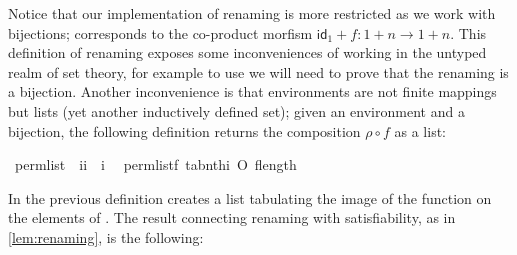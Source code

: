 Notice that our implementation of renaming is more restricted as we
work with bijections;  corresponds to
the co-product morfism $\mathsf{id}_{1}+f \colon 1 + n \to 1 +
n$. This definition of renaming exposes some inconveniences of working
in the untyped realm of set theory, for example to use  we
will need to prove that the renaming is a bijection. Another
inconvenience is that environments are not finite mappings but lists
(yet another inductively defined set); given an environment and a
bijection, the following definition returns the composition
$\rho \circ f$ as a list:
\begin{isabelle}
  \isamarkupfalse%
\ perm{\isacharunderscore}list\ {\isacharcolon}{\isacharcolon}\ {\isachardoublequoteopen}{\isacharbrackleft}i{\isacharcomma}i{\isacharbrackright}\ {\isasymRightarrow}\ i{\isachardoublequoteclose}\ \isanewline
\ {\isachardoublequoteopen}perm{\isacharunderscore}list{\isacharparenleft}f{\isacharcomma}\isasymrho{\isacharparenright}\ {\isacharequal}{\isacharequal}tab{\isacharparenleft}nth{\isacharunderscore}i{\isacharparenleft}\isasymrho{\isacharparenright}\ O\ f{\isacharcomma}length{\isacharparenleft}\isasymrho{\isacharparenright}{\isacharparenright}{\isachardoublequoteclose}
\end{isabelle}
In the previous definition  creates a list tabulating the
image of the function  on the elements of . 
The result connecting renaming with satisfiability, as in
\ref{lem:renaming}, is the following:
